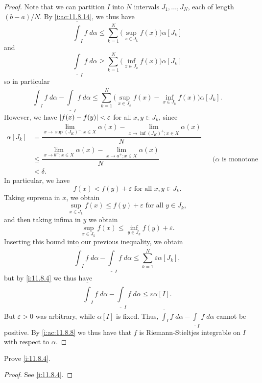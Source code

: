 \begin{proof}
  Note that we can partition \(I\) into \(N\) intervals \(J_1, \dots, J_N\), each of length \((b - a) / N\).
  By \cref{i:ac:11.8.14}, we thus have
  \[
    \overline{\int}_I f \; d \alpha \leq \sum_{k = 1}^N \big(\sup_{x \in J_k} f(x)\big) \alpha[J_k]
  \]
  and
  \[
    \underline{\int}_I f \; d \alpha \geq \sum_{k = 1}^N \big(\inf_{x \in J_k} f(x)\big) \alpha[J_k]
  \]
  so in particular
  \[
    \overline{\int}_I f \; d \alpha - \underline{\int}_I f \; d \alpha \leq \sum_{k = 1}^N \big(\sup_{x \in J_k} f(x) - \inf_{x \in J_k} f(x)\big) \alpha[J_k].
  \]
  However, we have \(\left\lvert f(x) - f(y)\right\rvert < \varepsilon\) for all \(x, y \in J_k\), since
  \begin{align*}
    \alpha[J_k] & = \dfrac{\lim_{x \to \sup(J_K)^- ; x \in X} \alpha(x) - \lim_{x \to \inf(J_K)^+ ; x \in X} \alpha(x)}{N}                                                 \\
                & \leq \dfrac{\lim_{x \to b^- ; x \in X} \alpha(x) - \lim_{x \to a^+ ; x \in X} \alpha(x)}{N}              &  & \text{(\(\alpha\) is monotone increasing)} \\
                & < \delta.
  \end{align*}
  In particular, we have
  \[
    f(x) < f(y) + \varepsilon \text{ for all } x, y \in J_k.
  \]
  Taking suprema in \(x\), we obtain
  \[
    \sup_{x \in J_k} f(x) \leq f(y) + \varepsilon \text{ for all } y \in J_k,
  \]
  and then taking infima in \(y\) we obtain
  \[
    \sup_{x \in J_k} f(x) \leq \inf_{y \in J_k} f(y) + \varepsilon.
  \]
  Inserting this bound into our previous inequality, we obtain
  \[
    \overline{\int}_I f \; d \alpha - \underline{\int}_I f \; d \alpha \leq \sum_{k = 1}^N \varepsilon \alpha[J_k],
  \]
  but by \cref{i:11.8.4} we thus have
  \[
    \overline{\int}_I f \; d \alpha - \underline{\int}_I f \; d \alpha \leq \varepsilon \alpha[I].
  \]
  But \(\varepsilon > 0\) was arbitrary, while \(\alpha[I]\) is fixed.
  Thus, \(\overline{\int}_I f \; d \alpha - \underline{\int}_I f \; d \alpha\) cannot be positive.
  By \cref{i:ac:11.8.8} we thus have that \(f\) is Riemann-Stieltjes integrable on \(I\) with respect to \(\alpha\).
\end{proof}

\exercisesection

\begin{ex}\label{i:ex:11.8.1}
  Prove \cref{i:11.8.4}.
\end{ex}

\begin{proof}
  See \cref{i:11.8.4}.
\end{proof}

